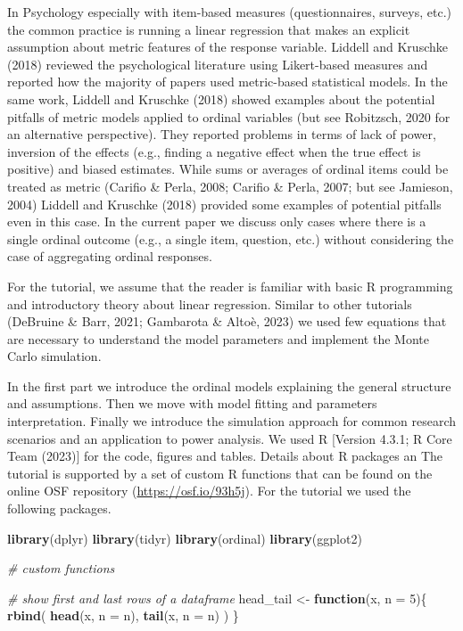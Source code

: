 \documentclass[
  man,floatsintext]{apa6}
\newenvironment{Shaded}{\begin{snugshade}}{\end{snugshade}}
\newcommand{\AttributeTok}[1]{\textcolor[rgb]{0.13,0.29,0.53}{#1}}
\newcommand{\CommentTok}[1]{\textcolor[rgb]{0.56,0.35,0.01}{\textit{#1}}}
\newcommand{\ControlFlowTok}[1]{\textcolor[rgb]{0.13,0.29,0.53}{\textbf{#1}}}
\newcommand{\DecValTok}[1]{\textcolor[rgb]{0.00,0.00,0.81}{#1}}
\newcommand{\FunctionTok}[1]{\textcolor[rgb]{0.13,0.29,0.53}{\textbf{#1}}}
\newcommand{\NormalTok}[1]{#1}
\newcommand{\OtherTok}[1]{\textcolor[rgb]{0.56,0.35,0.01}{#1}}
\begin{document}
In Psychology especially with item-based measures (questionnaires, surveys, etc.) the common practice is running a linear regression that makes an explicit assumption about metric features of the response variable. Liddell and Kruschke (2018) reviewed the psychological literature using Likert-based measures and reported how the majority of papers used metric-based statistical models. In the same work, Liddell and Kruschke (2018) showed examples about the potential pitfalls of metric models applied to ordinal variables (but see Robitzsch, 2020 for an alternative perspective). They reported problems in terms of lack of power, inversion of the effects (e.g., finding a negative effect when the true effect is positive) and biased estimates. While sums or averages of ordinal items could be treated as metric (Carifio \& Perla, 2008; Carifio \& Perla, 2007; but see Jamieson, 2004) Liddell and Kruschke (2018) provided some examples of potential pitfalls even in this case. In the current paper we discuss only cases where there is a single ordinal outcome (e.g., a single item, question, etc.) without considering the case of aggregating ordinal responses.

For the tutorial, we assume that the reader is familiar with basic R programming and introductory theory about linear regression. Similar to other tutorials (DeBruine \& Barr, 2021; Gambarota \& Altoè, 2023) we used few equations that are necessary to understand the model parameters and implement the Monte Carlo simulation.

In the first part we introduce the ordinal models explaining the general structure and assumptions. Then we move with model fitting and parameters interpretation. Finally we introduce the simulation approach for common research scenarios and an application to power analysis. We used R {[}Version 4.3.1; R Core Team (2023){]} for the code, figures and tables. Details about R packages an The tutorial is supported by a set of custom R functions that can be found on the online OSF repository (\href{https://osf.io/93h5j/?view_only=33f262ee28374a88b935f0a25cefdb34}{https://osf.io/93h5j}). For the tutorial we used the following packages.

\scriptsize

\begin{Shaded}
\begin{Highlighting}[]
\FunctionTok{library}\NormalTok{(dplyr)}
\FunctionTok{library}\NormalTok{(tidyr)}
\FunctionTok{library}\NormalTok{(ordinal)}
\FunctionTok{library}\NormalTok{(ggplot2)}

\CommentTok{\# custom functions}

\CommentTok{\# show first and last rows of a dataframe}
\NormalTok{head\_tail }\OtherTok{\textless{}{-}} \ControlFlowTok{function}\NormalTok{(x, }\AttributeTok{n =} \DecValTok{5}\NormalTok{)\{}
  \FunctionTok{rbind}\NormalTok{(}
    \FunctionTok{head}\NormalTok{(x, }\AttributeTok{n =}\NormalTok{ n),}
    \FunctionTok{tail}\NormalTok{(x, }\AttributeTok{n =}\NormalTok{ n)}
\NormalTok{  )}
\NormalTok{\}}
\end{Highlighting}
\end{Shaded}
\end{document}
